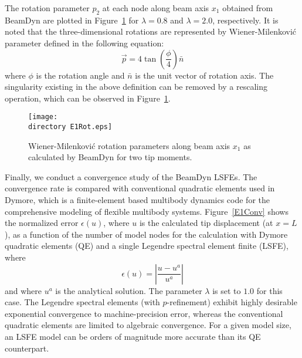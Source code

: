 The rotation parameter $p_2$ at each node along beam axis $x_1$ obtained from BeamDyn are plotted in Figure~\ref{E1Rot} for $\lambda = 0.8$ and $\lambda = 2.0$, respectively. It is noted that the three-dimensional rotations are represented by Wiener-Milenkovi\'c parameter defined in the following equation:
 \begin{equation}
     \vec{p} = 4 \tan\left(\frac{\phi}{4} \right) \bar{n} 
     \label{WMParameter}
 \end{equation}
where $\phi$ is the rotation angle and $\bar{n}$ is the unit vector of rotation axis. The singularity existing in the above definition can be removed by a rescaling operation, which can be observed in Figure~\ref{E1Rot}.
\begin{figure}
    \centering
    \texttt{[image: \\directory E1Rot.eps]}
    \caption{Wiener-Milenkovi\'c rotation parameters along beam axis $x_1$
as calculated by BeamDyn for two tip moments. }
    \label{E1Rot}
\end{figure}

Finally, we conduct a convergence study of the BeamDyn LSFEs. The
convergence rate is compared with conventional quadratic elements used in
Dymore, which is a finite-element
based multibody dynamics code for the comprehensive modeling of flexible
multibody systems. 
Figure~\ref{E1Conv} shows the normalized error
$\epsilon(u)$, where $u$ is the calculated tip displacement (at $x=L$), as a function
of the number of model nodes for the calculation with Dymore quadratic
elements (QE) and a single Legendre spectral element finite (LSFE), where
\begin{equation}
    \label{E1Error}
    \epsilon(u) = \left| \frac{u-u^a}{u^a} \right|
\end{equation}
and where $u^a$ is the analytical solution.  The parameter $\lambda$ is set
to $1.0$ for this case. The Legendre spectral elements (with $p$-refinement)
exhibit highly desirable exponential convergence to machine-precision error,
whereas the conventional quadratic elements are limited to algebraic
convergence.    For a given model size, an LSFE model can be orders of magnitude
more accurate than its QE counterpart.


